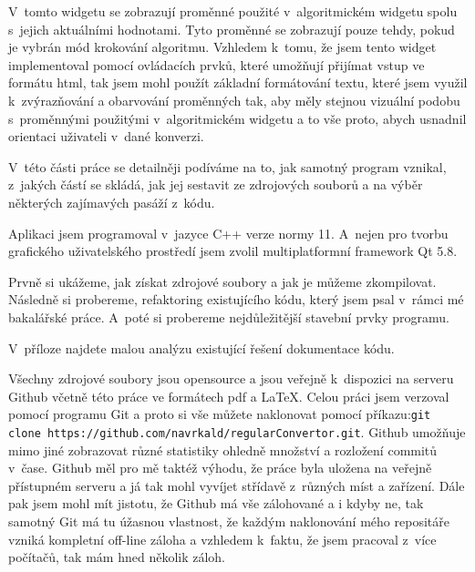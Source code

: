 

V~tomto widgetu se zobrazují proměnné použité v~algoritmickém widgetu spolu s~jejich  aktuálními hodnotami. Tyto proměnné se zobrazují pouze tehdy, pokud je vybrán mód krokování algoritmu. Vzhledem k~tomu, že jsem tento widget implementoval pomocí ovládacích prvků, které umožňují přijímat vstup ve formátu html, tak jsem mohl použít základní formátování textu, které jsem využil k~zvýrazňování a obarvování proměnných tak, aby měly stejnou vizuální podobu s~proměnnými použitými v~algoritmickém widgetu a to vše proto, abych usnadnil orientaci uživateli v~dané konverzi.


V~této části práce se detailněji podíváme na to, jak samotný program vznikal, z~jakých částí se skládá, jak jej sestavit ze zdrojových souborů a na výběr některých zajímavých pasáží z~kódu.

Aplikaci jsem programoval v~jazyce C++ verze normy 11. A~nejen pro tvorbu grafického uživatelského prostředí jsem zvolil multiplatformní framework Qt 5.8.

Prvně si ukážeme, jak získat zdrojové soubory a jak je můžeme zkompilovat. Následně si probereme, refaktoring existujícího kódu, který jsem psal v~rámci mé bakalářské práce. A~poté si probereme nejdůležitější stavební prvky programu.

V~příloze najdete malou analýzu existující řešení dokumentace kódu.


Všechny zdrojové soubory jsou opensource a jsou veřejně k~dispozici na serveru Github včetně této práce ve formátech pdf a \LaTeX. Celou práci jsem verzoval pomocí programu Git a proto si vše můžete naklonovat pomocí příkazu:\newline \texttt{git clone https://github.com/navrkald/regularConvertor.git}. Github umožňuje mimo jiné zobrazovat různé statistiky ohledně množství a rozložení commitů v~čase. Github měl pro mě taktéž výhodu, že práce byla uložena na veřejně přístupném serveru a já tak mohl vyvíjet střídavě z~různých míst a zařízení. Dále pak jsem mohl mít jistotu, že Github má vše zálohované a i kdyby ne, tak samotný Git má tu úžasnou vlastnost, že každým naklonování mého repositáře vzniká kompletní off-line záloha a vzhledem k~faktu, že jsem pracoval z~více počítačů, tak mám hned několik záloh.

